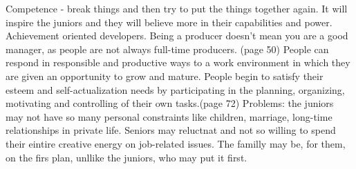 \documentclass[conference]{IEEEtran}
\begin{document}
Competence - break things and then try to put the things together again. It will inspire the juniors and they will believe more in their capabilities and power. Achievement oriented developers. Being a producer doesn't mean you are a good manager, as people are not always full-time producers. (page 50)
\newline\indent
People can respond in responsible and productive ways to a work environment in which they are given an opportunity to grow and mature. People begin to satisfy their esteem and self-actualization needs by participating in the planning, organizing, motivating and controlling of their own tasks.(page 72)
\newline\indent
Problems: the juniors may not have so many personal constraints like children, marriage, long-time relationships in private life. Seniors may reluctnat and not so willing to spend their eintire creative energy on job-related issues. The familly may be, for them, on the firs plan, unllike the juniors, who may put it first.
\end{document}
